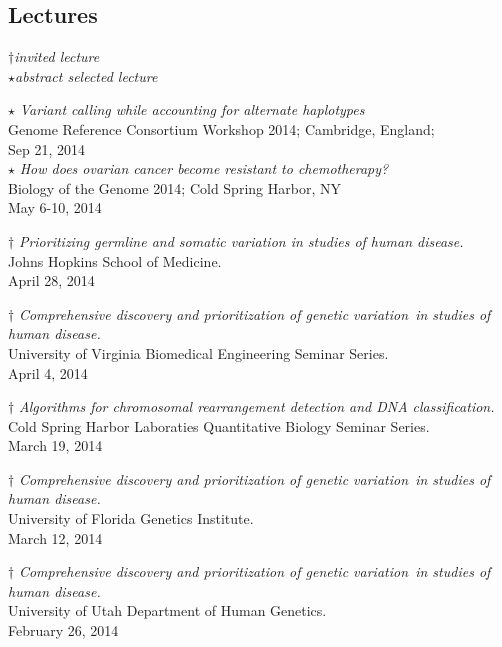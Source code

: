 \documentclass[margin,line]{cv}
\begin{document}
\begin{resume}
    \section{\mysidestyle Lectures}

    $\dagger$\textit{invited lecture}\\
    $\star$\textit{abstract selected lecture}

    $\star$ \textit{Variant calling while accounting for
    alternate haplotypes} \\
    Genome Reference Consortium Workshop 2014; Cambridge, England; \\
    Sep 21, 2014 \\

    $\star$ \textit{How does ovarian cancer become resistant to chemotherapy?} \\
    Biology of the Genome 2014; Cold Spring Harbor, NY \\
    May 6-10, 2014

    $\dagger$ \textit{Prioritizing germline and somatic variation in studies of human disease.} \\
    Johns Hopkins School of Medicine. \\
    April 28, 2014

    $\dagger$ \textit{Comprehensive discovery and prioritization of genetic variation in studies of human disease.} \\
    University of Virginia Biomedical Engineering Seminar Series. \\
    April 4, 2014

    $\dagger$ \textit{Algorithms for chromosomal rearrangement detection and DNA classification.} \\
    Cold Spring Harbor Laboraties Quantitative Biology Seminar Series. \\
    March 19, 2014

    $\dagger$ \textit{Comprehensive discovery and prioritization of genetic variation in studies of human disease.} \\
    University of Florida Genetics Institute. \\
    March 12, 2014

    $\dagger$ \textit{Comprehensive discovery and prioritization of genetic variation in studies of human disease.} \\
    University of Utah Department of Human Genetics. \\
    February 26, 2014


\end{resume}
\end{document}
